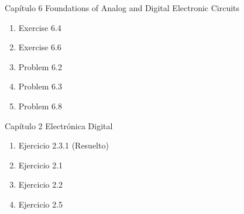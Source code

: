 \documentclass[11pt,fancy,lang=es]{elegantbook}
\begin{document}
\begin{problemset}
    \item Capítulo 6 Foundations of Analog and Digital Electronic Circuits
    \begin{enumerate}
        \item Exercise 6.4
        \item Exercise 6.6
        \item Problem 6.2
        \item Problem 6.3
        \item Problem 6.8
    \end{enumerate}



    \item Capítulo 2 Electrónica Digital
    \begin{enumerate}
        \item Ejercicio 2.3.1 (Resuelto)
        \item Ejercicio 2.1
        \item Ejercicio 2.2
        \item Ejercicio 2.5
    \end{enumerate}


\end{problemset}
\end{document}
